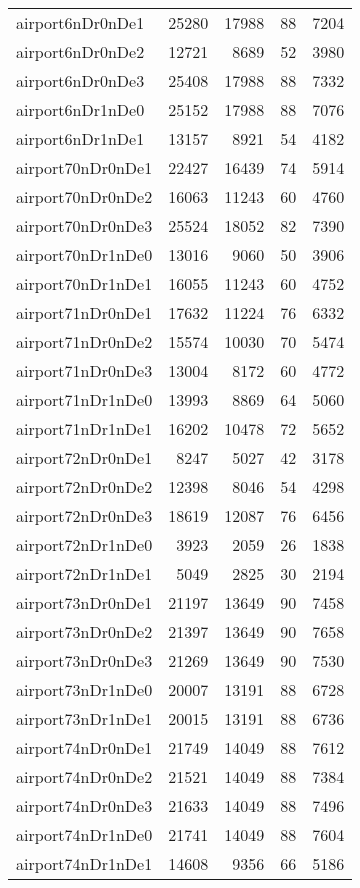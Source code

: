 \begin{longtable}{lrrrr}
airport6nDr0nDe1 & 25280 & 17988 & 88 & 7204 \\
airport6nDr0nDe2 & 12721 & 8689 & 52 & 3980 \\
airport6nDr0nDe3 & 25408 & 17988 & 88 & 7332 \\
airport6nDr1nDe0 & 25152 & 17988 & 88 & 7076 \\
airport6nDr1nDe1 & 13157 & 8921 & 54 & 4182 \\
airport70nDr0nDe1 & 22427 & 16439 & 74 & 5914 \\
airport70nDr0nDe2 & 16063 & 11243 & 60 & 4760 \\
airport70nDr0nDe3 & 25524 & 18052 & 82 & 7390 \\
airport70nDr1nDe0 & 13016 & 9060 & 50 & 3906 \\
airport70nDr1nDe1 & 16055 & 11243 & 60 & 4752 \\
airport71nDr0nDe1 & 17632 & 11224 & 76 & 6332 \\
airport71nDr0nDe2 & 15574 & 10030 & 70 & 5474 \\
airport71nDr0nDe3 & 13004 & 8172 & 60 & 4772 \\
airport71nDr1nDe0 & 13993 & 8869 & 64 & 5060 \\
airport71nDr1nDe1 & 16202 & 10478 & 72 & 5652 \\
airport72nDr0nDe1 & 8247 & 5027 & 42 & 3178 \\
airport72nDr0nDe2 & 12398 & 8046 & 54 & 4298 \\
airport72nDr0nDe3 & 18619 & 12087 & 76 & 6456 \\
airport72nDr1nDe0 & 3923 & 2059 & 26 & 1838 \\
airport72nDr1nDe1 & 5049 & 2825 & 30 & 2194 \\
airport73nDr0nDe1 & 21197 & 13649 & 90 & 7458 \\
airport73nDr0nDe2 & 21397 & 13649 & 90 & 7658 \\
airport73nDr0nDe3 & 21269 & 13649 & 90 & 7530 \\
airport73nDr1nDe0 & 20007 & 13191 & 88 & 6728 \\
airport73nDr1nDe1 & 20015 & 13191 & 88 & 6736 \\
airport74nDr0nDe1 & 21749 & 14049 & 88 & 7612 \\
airport74nDr0nDe2 & 21521 & 14049 & 88 & 7384 \\
airport74nDr0nDe3 & 21633 & 14049 & 88 & 7496 \\
airport74nDr1nDe0 & 21741 & 14049 & 88 & 7604 \\
airport74nDr1nDe1 & 14608 & 9356 & 66 & 5186 \\

\end{longtable}
